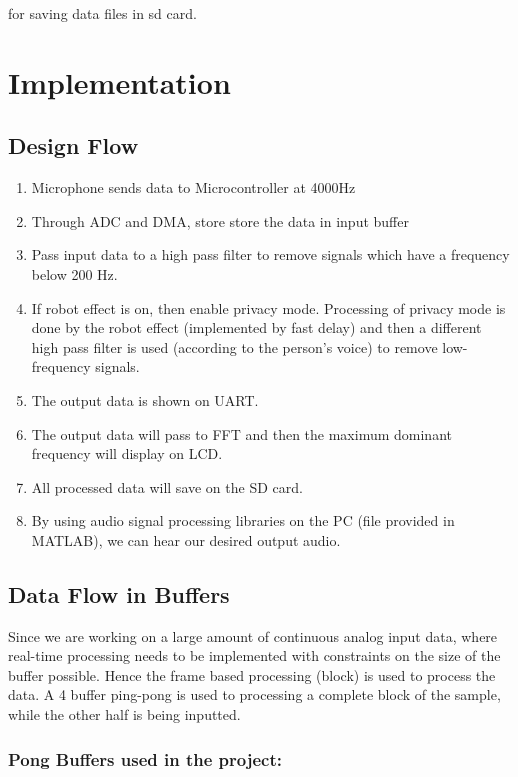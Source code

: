 \documentclass[11pt]{article}
\begin{document}
for saving data files in sd card.

\section{Implementation}
\label{sec:orge4b4b0b}
\subsection{Design Flow}
\label{sec:org4a0a02e}
\begin{enumerate}
\item Microphone sends data to Microcontroller at 4000Hz
\item Through ADC and DMA, store store the data in input buffer
\item Pass input data to a high pass filter to remove signals which have a frequency below 200 Hz.
\item If robot effect is on, then enable privacy mode. Processing of privacy mode is done by the robot effect (implemented by fast delay) and then a different high pass filter is used (according to the person's voice) to remove low-frequency signals.
\item The output data is shown on UART.
\item The output data will pass to FFT and then the maximum dominant frequency will display on LCD.
\item All processed data will save on the SD card.
\item By using audio signal processing libraries on the PC (file provided in MATLAB), we can hear our desired output audio.
\end{enumerate}

\subsection{Data Flow in Buffers}
\label{sec:orgda4797a}
Since we are working on a large amount of continuous analog input data, where real-time processing needs to be implemented with constraints on the size of the buffer possible. Hence the frame based processing (block) is used to process the data. A 4 buffer ping-pong is used to processing a complete block of the sample, while the other half is being inputted.

\subsubsection*{Pong Buffers used in the project:}
\label{sec:org66eea40}
\end{document}
